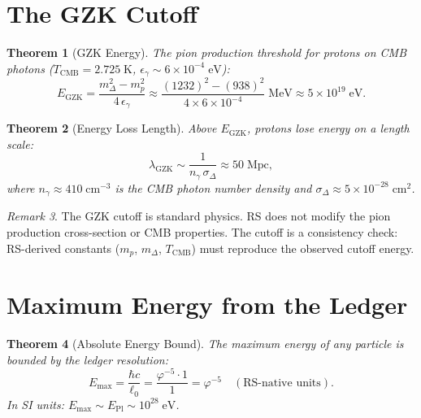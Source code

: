 \documentclass[12pt,a4paper]{article}
\newtheorem{theorem}{Theorem}[section]
\theoremstyle{definition}
\theoremstyle{remark}
\newtheorem{remark}[theorem]{Remark}
\begin{document}
\section{The GZK Cutoff}
\label{sec:gzk}

\begin{theorem}[GZK Energy]
\label{thm:gzk}
The pion production threshold for protons on CMB photons
($T_{\mathrm{CMB}} = 2.725\;\mathrm{K}$,
$\epsilon_\gamma \sim 6 \times 10^{-4}\;\mathrm{eV}$):
\begin{equation}
  E_{\mathrm{GZK}} = \frac{m_\Delta^2 - m_p^2}{4\,\epsilon_\gamma}
  \approx \frac{(1232)^2 - (938)^2}{4 \times 6 \times 10^{-4}}
  \;\mathrm{MeV} \approx 5 \times 10^{19}\;\mathrm{eV}.
\end{equation}
\end{theorem}

\begin{theorem}[Energy Loss Length]
Above $E_{\mathrm{GZK}}$, protons lose energy on a length scale:
\begin{equation}
  \lambda_{\mathrm{GZK}} \sim \frac{1}{n_\gamma\,\sigma_{\Delta}}
  \approx 50\;\mathrm{Mpc},
\end{equation}
where $n_\gamma \approx 410\;\mathrm{cm^{-3}}$ is the CMB photon
number density and $\sigma_\Delta \approx 5 \times
10^{-28}\;\mathrm{cm^2}$.
\end{theorem}

\begin{remark}
The GZK cutoff is standard physics.  RS does not modify the
pion production cross-section or CMB properties.  The cutoff is
a consistency check: RS-derived constants ($m_p$, $m_\Delta$,
$T_{\mathrm{CMB}}$) must reproduce the observed cutoff energy.
\end{remark}

\section{Maximum Energy from the Ledger}
\label{sec:max-energy}

\begin{theorem}[Absolute Energy Bound]
\label{thm:max}
The maximum energy of any particle is bounded by the ledger
resolution:
\begin{equation}
  \boxed{E_{\max} = \frac{\hbar c}{\ell_0}
  = \frac{\varphi^{-5} \cdot 1}{1} = \varphi^{-5}
  \quad (\text{RS-native units}).}
\end{equation}
In SI units: $E_{\max} \sim E_{\mathrm{Pl}} \sim
10^{28}\;\mathrm{eV}$.
\end{theorem}
\end{document}
